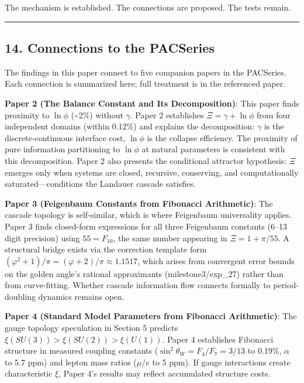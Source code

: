 \documentclass[
  11pt,
  a4paper]{article}
\begin{document}
The mechanism is established. The connections are proposed. The tests
remain.

\begin{center}\rule{0.5\linewidth}{0.5pt}\end{center}

\subsection{14. Connections to the
PACSeries}\label{connections-to-the-pacseries}

The findings in this paper connect to five companion papers in the
PACSeries. Each connection is summarized here; full treatment is in the
referenced paper.

\textbf{Paper 2 (The Balance Constant and Its Decomposition)}: This
paper finds proximity to \(\ln\phi\) (\textasciitilde2\%) without
\(\gamma\). Paper 2 establishes \(\Xi = \gamma + \ln\phi\) from four
independent domains (within 0.12\%) and explains the decomposition:
\(\gamma\) is the discrete-continuous interface cost, \(\ln\phi\) is the
collapse efficiency. The proximity of pure information partitioning to
\(\ln\phi\) at natural parameters is consistent with this decomposition.
Paper 2 also presents the conditional attractor hypothesis: \(\Xi\)
emerges only when systems are closed, recursive, conserving, and
computationally saturated---conditions the Landauer cascade satisfies.

\textbf{Paper 3 (Feigenbaum Constants from Fibonacci Arithmetic)}: The
cascade topology is self-similar, which is where Feigenbaum universality
applies. Paper 3 finds closed-form expressions for all three Feigenbaum
constants (6--13 digit precision) using \(55 = F_{10}\), the same number
appearing in \(\Xi = 1 + \pi/55\). A structural bridge exists via the
correction template form
\((\varphi^2 + 1)/\pi = (\varphi + 2)/\pi \approx 1.1517\), which arises
from convergent error bounds on the golden angle's rational approximants
(milestone3/exp\_27) rather than from curve-fitting. Whether cascade
information flow connects formally to period-doubling dynamics remains
open.

\textbf{Paper 4 (Standard Model Parameters from Fibonacci Arithmetic)}:
The gauge topology speculation in Section 5 predicts
\(\xi(SU(3)) > \xi(SU(2)) > \xi(U(1))\). Paper 4 establishes Fibonacci
structure in measured coupling constants
(\(\sin^2\theta_W = F_4/F_7 = 3/13\) to 0.19\%, \(\alpha\) to 5.7 ppm)
and lepton mass ratios (\(\mu/e\) to 5 ppm). If gauge interactions
create characteristic \(\xi\), Paper 4's results may reflect accumulated
structure costs.
\end{document}
